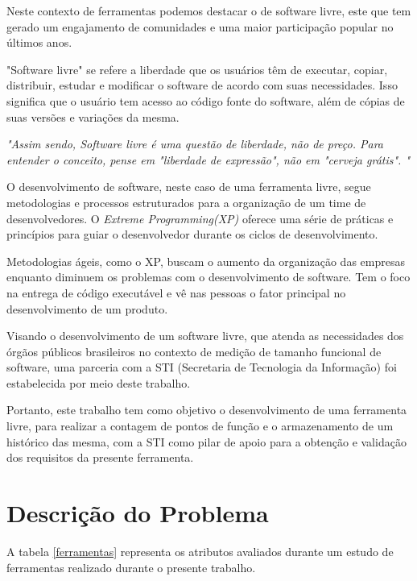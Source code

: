 Neste contexto de ferramentas podemos destacar o de software livre, este que tem gerado um engajamento de comunidades e uma maior participação popular no últimos anos. \cite{Eilola:2002} \nocite{Anota:2016}

"Software livre" se refere a liberdade que os usuários têm de executar, copiar, distribuir, estudar e modificar o software de acordo com suas necessidades. Isso significa que o usuário tem acesso ao código fonte do software, além de cópias de suas versões e variações da mesma. \cite{Stallman:2003}

\textit{"Assim sendo, Software livre é uma questão de liberdade, não de preço. Para entender o conceito, pense em "liberdade de expressão", não em "cerveja grátis". "} \cite{Stallman:2003}

O desenvolvimento de software, neste caso de uma ferramenta livre, segue metodologias e processos estruturados para a organização de um time de desenvolvedores. O \textit{Extreme Programming(XP)} oferece uma série de práticas e princípios para guiar o desenvolvedor durante os ciclos de desenvolvimento.

Metodologias ágeis, como o XP, buscam o aumento da organização das empresas enquanto diminuem os problemas com o desenvolvimento de software. Tem o foco na entrega de código executável e vê nas pessoas o fator principal no desenvolvimento de um produto. \cite{Maurer:2002}

Visando o desenvolvimento de um software livre, que atenda as necessidades dos órgãos públicos brasileiros no contexto de medição de tamanho funcional de software, uma parceria com a STI (Secretaria de Tecnologia da Informação) foi estabelecida por meio deste trabalho.

Portanto, este trabalho tem como objetivo o desenvolvimento de uma ferramenta livre, para realizar a contagem de pontos de função e o armazenamento de um histórico das mesma, com a STI como pilar de apoio para a obtenção e validação dos requisitos da presente ferramenta.

\section{Descrição do Problema}

A tabela \ref{ferramentas} representa os atributos avaliados durante um estudo de ferramentas realizado durante o presente trabalho.

